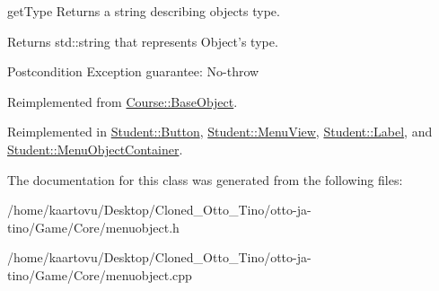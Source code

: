 get\-Type Returns a string describing objects type. 

\begin{DoxyReturn}{Returns}
std\-::string that represents Object's type. 
\end{DoxyReturn}
\begin{DoxyPostcond}{Postcondition}
Exception guarantee\-: No-\/throw 
\end{DoxyPostcond}


Reimplemented from \hyperlink{class_course_1_1_base_object_ae66880c372a67483fc4205a55839443a}{Course\-::\-Base\-Object}.



Reimplemented in \hyperlink{class_student_1_1_button_a2c69f5dcee1036b11154e799d6621acb}{Student\-::\-Button}, \hyperlink{class_student_1_1_menu_view_a6c9f9c66b86d2772115e0bbb50a977bc}{Student\-::\-Menu\-View}, \hyperlink{class_student_1_1_label_a35e4181d3b859ce8008029b056b79b79}{Student\-::\-Label}, and \hyperlink{class_student_1_1_menu_object_container_aca16734d7c1a5d4445dd8984e5e75463}{Student\-::\-Menu\-Object\-Container}.



The documentation for this class was generated from the following files\-:\begin{DoxyCompactItemize}
\item 
/home/kaartovu/\-Desktop/\-Cloned\-\_\-\-Otto\-\_\-\-Tino/otto-\/ja-\/tino/\-Game/\-Core/menuobject.\-h\item 
/home/kaartovu/\-Desktop/\-Cloned\-\_\-\-Otto\-\_\-\-Tino/otto-\/ja-\/tino/\-Game/\-Core/menuobject.\-cpp\end{DoxyCompactItemize}
